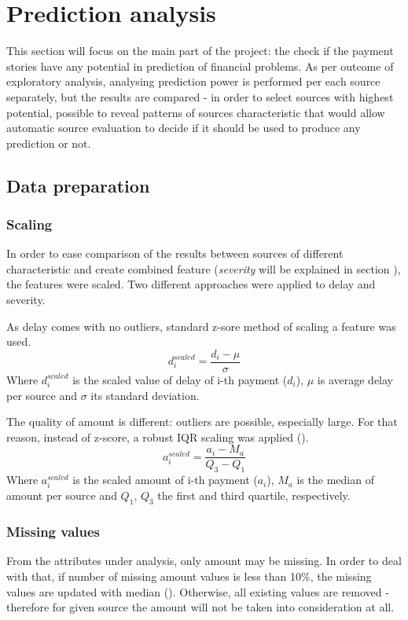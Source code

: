 \documentclass{article}
\begin{document}
\pagebreak

\section{Prediction analysis}
\label{section:prediction-analysis}

This section will focus on the main part of the project: the check if the payment stories have any potential
in prediction of financial problems.
As per outcome of exploratory analysis, analysing prediction power is performed per each source separately,
but the results are compared - in order to select sources with highest potential, possible to reveal patterns of sources characteristic that would allow automatic source evaluation to decide if it should be used to produce any prediction or not.

\subsection{Data preparation}

\subsubsection{Scaling}
In order to ease comparison of the results between sources of different characteristic and
create combined feature (\textit{severity} will be explained in section ), the features were scaled.
Two different approaches were applied to delay and severity.\par
As delay comes with no outliers, standard z-sore method of scaling a feature was used.
\[d_i^{scaled}=\frac{d_i-\mu}{\sigma}\]
Where \(d_i^{scaled}\) is the scaled value of delay of i-th payment (\(d_i\)), $\mu$ is average delay per source and $\sigma$ its standard deviation.
\par
The quality of amount is different: outliers are possible, especially large.
For that reason, instead of z-score, a robust IQR scaling was applied (\cite{scikitlearn}).
\[a_i^{scaled}=\frac{a_i-M_a}{Q_3-Q_1}\]
Where \(a_i^{scaled}\) is the scaled amount of i-th payment (\(a_i\)), \(M_a\) is the median of amount per source and \(Q_1\), \(Q_3\) the first and third quartile, respectively.

\subsubsection{Missing values}
From the attributes under analysis, only amount may be missing.
In order to deal with that, if number of missing amount values is less than 10\%, the missing values are updated with median (\cite{szeliga}).
Otherwise, all existing values are removed - therefore for given source the amount will not be taken into consideration at all.
\end{document}
